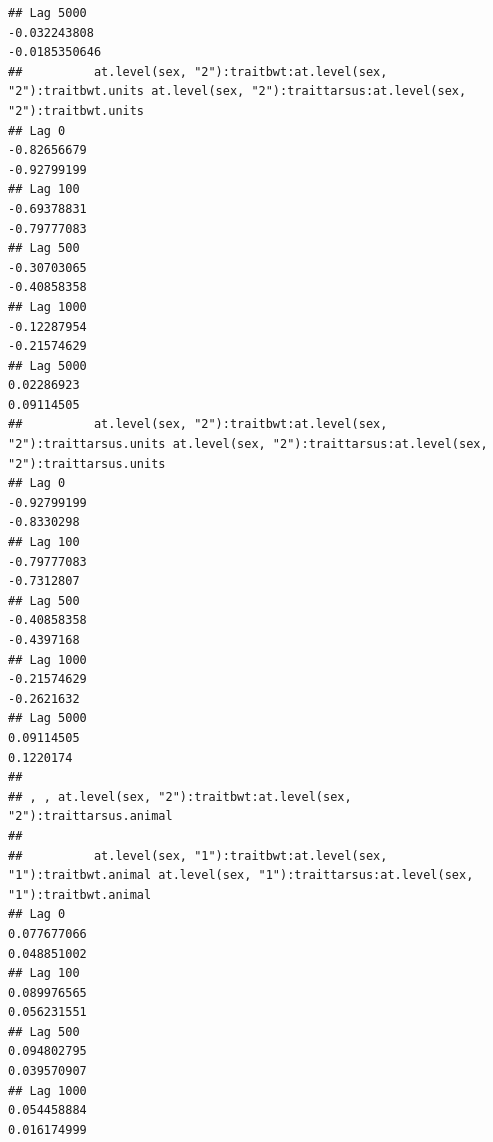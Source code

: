 \documentclass[
  12pt,
]{book}
\begin{document}
\begin{verbatim}
## Lag 5000                                                     -0.032243808                                                       -0.0185350646
##          at.level(sex, "2"):traitbwt:at.level(sex, "2"):traitbwt.units at.level(sex, "2"):traittarsus:at.level(sex, "2"):traitbwt.units
## Lag 0                                                      -0.82656679                                                      -0.92799199
## Lag 100                                                    -0.69378831                                                      -0.79777083
## Lag 500                                                    -0.30703065                                                      -0.40858358
## Lag 1000                                                   -0.12287954                                                      -0.21574629
## Lag 5000                                                    0.02286923                                                       0.09114505
##          at.level(sex, "2"):traitbwt:at.level(sex, "2"):traittarsus.units at.level(sex, "2"):traittarsus:at.level(sex, "2"):traittarsus.units
## Lag 0                                                         -0.92799199                                                          -0.8330298
## Lag 100                                                       -0.79777083                                                          -0.7312807
## Lag 500                                                       -0.40858358                                                          -0.4397168
## Lag 1000                                                      -0.21574629                                                          -0.2621632
## Lag 5000                                                       0.09114505                                                           0.1220174
## 
## , , at.level(sex, "2"):traitbwt:at.level(sex, "2"):traittarsus.animal
## 
##          at.level(sex, "1"):traitbwt:at.level(sex, "1"):traitbwt.animal at.level(sex, "1"):traittarsus:at.level(sex, "1"):traitbwt.animal
## Lag 0                                                       0.077677066                                                       0.048851002
## Lag 100                                                     0.089976565                                                       0.056231551
## Lag 500                                                     0.094802795                                                       0.039570907
## Lag 1000                                                    0.054458884                                                       0.016174999

\end{verbatim}
\end{document}
